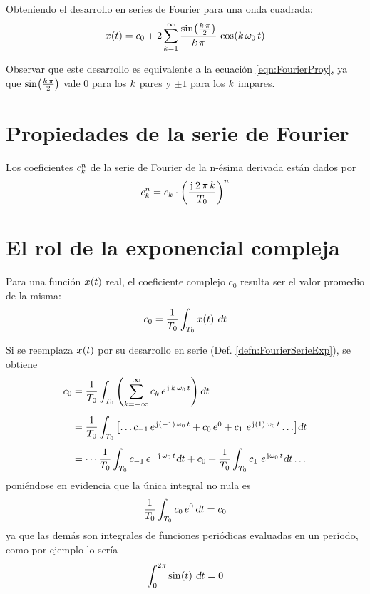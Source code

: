 \begin{mdframed}[style=ExampleFrame]
    Obteniendo el desarrollo en series de Fourier para una onda cuadrada:
    \[
        \fx[x]{t} = c_0 + 2 \sum_{\kth=1}^{\infty} \frac{\fx[\sin]{\frac{\kth \, \pi}{2}}}{\kth \, \pi} \, \fx[\cos]{\kth \, \omega_0 \, t}
    \]

    Observar que este desarrollo es equivalente a la ecuación \ref{eqn:FourierProy}, ya que $\fx[\sin]{\frac{\kth \, \pi}{2}}$ vale 0 para los $\kth$ pares y $\pm1$ para los $\kth$ impares.
\end{mdframed}

\section{Propiedades de la serie de Fourier}

\begin{mdframed}[style=PropertyFrame]
    \begin{prop}
    \end{prop}
    Los coeficientes $c_\kth^\nth$ de la serie de Fourier de la n-ésima derivada están dados por
    \[
        c_\kth^\nth = c_\kth \cdot \inParentheses{\frac{\iu \, 2 \, \pi \, \kth}{T_0}}^\nth
    \]
\end{mdframed}

\section{El rol de la exponencial compleja}

Para una función $\fx[x]{t}$ real, el coeficiente complejo $c_0$ resulta ser el valor promedio de la misma:
\[
    c_0 = \frac{1}{T_0} \int_{T_0} \fx[x]{t} \, \dif t
\]

Si se reemplaza $\fx[x]{t}$ por su desarrollo en serie (Def. \ref{defn:FourierSerieExp}), se obtiene
\begin{align}
    c_0
    &= \frac{1}{T_0} \int_{T_0} \inParentheses{\sum_{\kth=-\infty}^\infty c_\kth \, e^{\iu \, \kth \, \omega_0 \, t}} \dif t
    \notag
    \\[1ex]
    &= \frac{1}{T_0} \int_{T_0} \inBrackets{\dots c_{-1} \, e^{\iu \inParentheses{-1} \, \omega_0 \, t} + c_0 \, e^0 + c_1 \, \, e^{\iu \inParentheses{1} \, \omega_0 \, t} \dots} \dif t
    \label{eqn:coeficientes}
    \\[1ex]
    &= \cdots \frac{1}{T_0} \int_{T_0} c_{-1} \, e^{- \iu \, \omega_0 \, t} \dif t
    + c_0
    + \frac{1}{T_0} \int_{T_0} c_1 \, \, e^{\iu \omega_0 \, t} \dif t \dots
    \notag
\end{align}
poniéndose en evidencia que la única integral no nula es
\[
    \frac{1}{T_0} \int_{T_0} c_0 \, e^0 \, \dif t = c_0
\]
ya que las demás son integrales de funciones periódicas evaluadas en un período, como por ejemplo lo sería
\[
    \int_0^{2\pi} \fx[\sin]{t} \, \dif t = 0
\]

